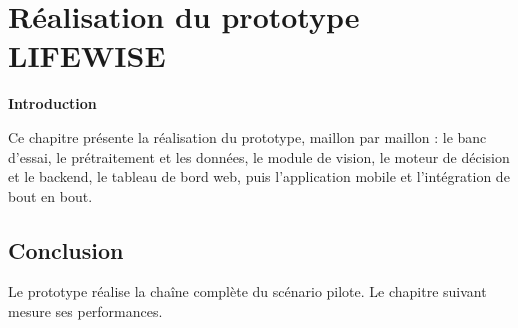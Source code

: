 \chapter{\textcolor{mycolor}{\textbf{Réalisation du prototype LIFEWISE}}}
\fancyhf{}
\fancyhead[L]{\small\itshape\nouppercase{\rightmark}}
\fancyfoot[L]{\small\itshape\nouppercase{\leftmark}}
\fancyfoot[R]{\small\itshape\thepage}
\renewcommand{\headrulewidth}{1pt}
\renewcommand{\footrulewidth}{0.4pt}

\vfill
\begin{flushright}{\Large\bfseries\textcolor{mycolor}{Introduction}}\end{flushright}

Ce chapitre présente la réalisation du prototype, maillon par maillon : le banc d'essai, le prétraitement et les données, le module de vision, le moteur de décision et le backend, le tableau de bord web, puis l'application mobile et l'intégration de bout en bout.

\clearpage














\section*{Conclusion}

Le prototype réalise la chaîne complète du scénario pilote. Le chapitre suivant mesure ses performances.

